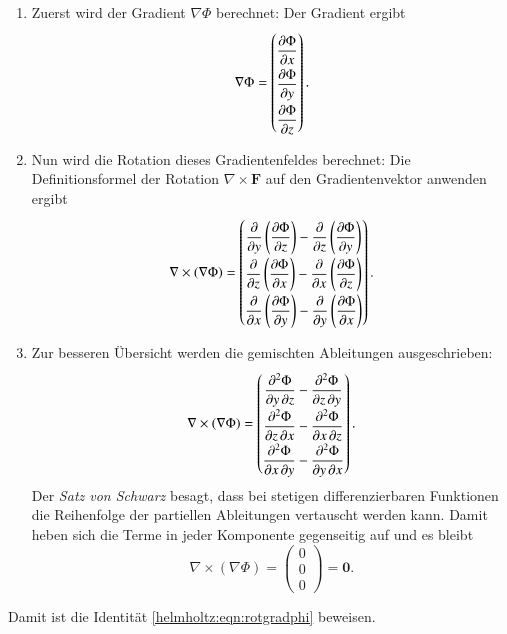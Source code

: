 \begin{enumerate}
    \item Zuerst wird der Gradient $\nabla\Phi$ berechnet:
    Der Gradient ergibt
    \[
    \nabla \Phi =
	\renewcommand{\arraystretch}{2.0}
    \begin{pmatrix}
        \displaystyle \frac{\partial \Phi}{\partial x} \\
        \displaystyle \frac{\partial \Phi}{\partial y} \\
        \displaystyle \frac{\partial \Phi}{\partial z}
    \end{pmatrix}.
    \]

    \item Nun wird die Rotation dieses Gradientenfeldes berechnet:
    Die Definitionsformel
    der Rotation $\nabla \times \boldsymbol{F}$ auf den Gradientenvektor
    anwenden ergibt
    \[
    \nabla \times (\nabla \Phi) =
	\renewcommand{\arraystretch}{2.0}
    \begin{pmatrix}
        \displaystyle\frac{\partial}{\partial y}\left(\frac{\partial \Phi}{\partial z}\right) - \frac{\partial}{\partial z}\left(\frac{\partial \Phi}{\partial y}\right) \\
        \displaystyle\frac{\partial}{\partial z}\left(\frac{\partial \Phi}{\partial x}\right) - \frac{\partial}{\partial x}\left(\frac{\partial \Phi}{\partial z}\right) \\
        \displaystyle\frac{\partial}{\partial x}\left(\frac{\partial \Phi}{\partial y}\right) - \frac{\partial}{\partial y}\left(\frac{\partial \Phi}{\partial x}\right)
    \end{pmatrix}.
    \]

    \item %
    
    Zur besseren Übersicht werden die gemischten Ableitungen ausgeschrieben:
    \[
    \nabla \times (\nabla \Phi) =
	\renewcommand{\arraystretch}{2.0}
    \begin{pmatrix}
        \displaystyle\frac{\partial^2 \Phi}{\partial y\, \partial z} - \frac{\partial^2 \Phi}{\partial z\, \partial y} \\
        \displaystyle\frac{\partial^2 \Phi}{\partial z\, \partial x} - \frac{\partial^2 \Phi}{\partial x\, \partial z} \\
        \displaystyle\frac{\partial^2 \Phi}{\partial x\, \partial y} - \frac{\partial^2 \Phi}{\partial y\, \partial x}
    \end{pmatrix}.
    \]
    Der \emph{Satz von Schwarz} besagt, dass bei stetigen differenzierbaren
    Funktionen die Reihenfolge der partiellen Ableitungen vertauscht werden
    kann.
    Damit heben sich die Terme in jeder Komponente gegenseitig auf
    und es bleibt
    \[
    \nabla \times (\nabla \Phi)  =
    \begin{pmatrix}
        0 \\
        0 \\
        0
    \end{pmatrix} = \boldsymbol{0}.
    \]
\end{enumerate}
Damit ist die Identität \eqref{helmholtz:eqn:rotgradphi} beweisen.


